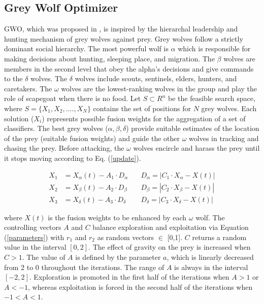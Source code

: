 \subsection{Grey Wolf Optimizer }\label{GWOalgo}
GWO, which was proposed in \cite{mirjalili2014}, is inspired by the hierarchal leadership and hunting mechanism of grey wolves against prey. Grey wolves follow a strictly dominant social hierarchy. The most powerful wolf is $\alpha$ which is responsible for making decisions about hunting, sleeping place, and migration. The $\beta$ wolves are members in the second level that obey the alpha's decisions and give commands to the $\delta$ wolves. The $\delta$ wolves include scouts, sentinels, elders, hunters, and caretakers. The $\omega$ wolves are the lowest-ranking wolves in the group and play the role of scapegoat when there is no food.
Let $S\subset R^n$ be the feasible search space, where $S=\{X_1, X_2,...., X_N\}$ contains the set of positions for $N$ grey wolves. Each solution ($X_i$) represents possible fusion weights for the aggregation of a set of classifiers. The best grey wolves ($\alpha,\beta,\delta$) provide suitable estimates of the location of the prey (suitable fusion weights) and guide the other $\omega$ wolves in tracking and chasing the prey. Before attacking, the $\omega$ wolves encircle and harass the prey until it stops moving according to Eq. (\ref{update}).

\begin{equation}
	\label{update}
	\begin{aligned}
		X_1 & =X_\alpha(t)-A_{1} \cdot D_\alpha & \quad D_\alpha=|C_1 \cdot X_\alpha-X(t)| \\
		X_2 & =X_\beta(t)-A_{2} \cdot D_\beta   & \quad D_\beta=|C_2 \cdot X_\beta-X(t)|   \\
		X_3 & =X_\delta(t)-A_{3} \cdot D_\delta & \quad D_\delta=|C_3 \cdot X_\delta-X(t)|
	\end{aligned}
\end{equation}

\noindent where $X(t)$ is the fusion weights to be enhanced by each $\omega$ wolf. The controlling vectors $A$ and $C$ balance exploration and exploitation via Equation (\ref{parameters}) with $r_1$ and $r_2$ as random vectors $\in$ [0,1]. $C$ returns a random value in the interval $[0,2]$. The effect of gravity on the prey is increased when $C>1$.  The value of $A$ is defined by the parameter $a$, which is linearly decreased from 2 to 0 throughout the iterations. The range of $A$ is always in the interval $[-2,2]$. Exploration is promoted in the first half of the iterations when $A > 1$ or $A < -1$, whereas exploitation is forced in the second half of the iterations when $-1 < A < 1$.

